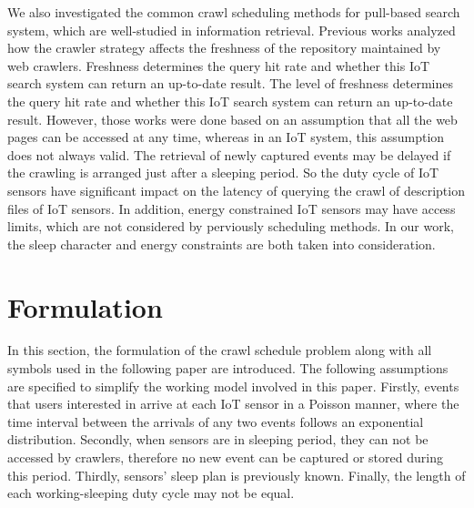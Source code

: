 \documentclass[conference]{IEEEtran}
\begin{document}
We also investigated the common crawl scheduling methods for pull-based search system, which are well-studied in information retrieval.
Previous works\cite{Cho2000}\cite{Wolf2002}\cite{Challenger2004} analyzed how the crawler strategy affects the freshness of the repository maintained by web crawlers.
Freshness determines the query hit rate and whether this IoT search system can return an up-to-date result. 
The level of freshness determines the query hit rate and whether this IoT search system can return an up-to-date result.
However, those works were done based on an assumption that all the web pages can be accessed at any time, whereas in an IoT system, this assumption does not always valid.
The retrieval of newly captured events may be delayed if the crawling is arranged just after a sleeping period.
So the duty cycle of IoT sensors have significant impact on the latency of querying the crawl of description files of IoT sensors.
In addition, energy constrained IoT sensors may have access limits, which are not considered by perviously scheduling methods.
In our work, the sleep character and energy constraints are both taken into consideration.

\section{Formulation}\label{formulation}

In this section, the formulation of the crawl schedule problem along with all symbols used in the following paper are introduced. 
The following assumptions are specified to simplify the working model involved in this paper.
Firstly, events that users interested in arrive at each IoT sensor in a Poisson manner, where the time interval between the arrivals of any two events follows an exponential distribution. 
Secondly, when sensors are in sleeping period, they can not be accessed by crawlers, therefore no new event can be captured or stored during this period.
Thirdly, sensors' sleep plan is previously known.
Finally, the length of each working-sleeping duty cycle may not be equal.
\end{document}
